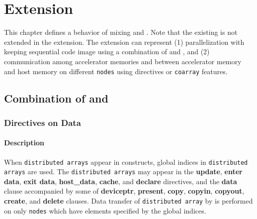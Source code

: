 \chapter{{\XMP} Extension}\label{chap:xmp-ex}
This chapter defines a behavior of mixing {\XMP} and {\OACC}.
Note that the existing {\OACC} is not extended in the {\XMP} extension.
The {\XMP} extension can represent 
(1) parallelization with keeping sequential code image using a combination of {\XMP} and {\OACC},
and
(2) communication among accelerator memories and between accelerator memory and host memory on different {\tt nodes}
using {\XACC} directives or {\tt coarray} features.

\section{Combination of {\XMP} and {\OACC}}
\subsection{{\OACC} Directives on Data}
\subsubsection*{Description}
When {\tt distributed arrays} appear in {\OACC} constructs,
global indices in {\tt distributed arrays} are used.
The {\tt distributed arrays} may appear in the {\OACC} {\bf update}, {\bf enter data}, {\bf exit data}, 
{\bf host\_data}, {\bf cache}, and {\bf declare} directives,
and the {\bf data} clause accompanied by some of 
{\bf deviceptr}, {\bf present}, {\bf copy}, {\bf copyin}, 
{\bf copyout}, {\bf create}, and {\bf delete} clauses.
Data transfer of {\tt distributed array} by {\OACC} is performed on only {\tt nodes} which have elements specified by the global indices.

